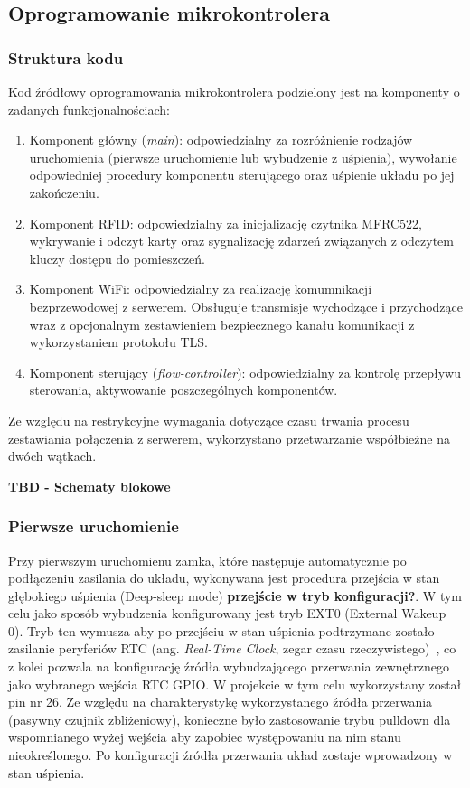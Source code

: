         \subsection{Oprogramowanie mikrokontrolera}

            \subsubsection{Struktura kodu}
                Kod źródłowy oprogramowania mikrokontrolera podzielony jest na komponenty o zadanych funkcjonalnościach:
                \begin{enumerate}
                    \item Komponent główny (\textit{main}): odpowiedzialny za rozróżnienie rodzajów uruchomienia (pierwsze uruchomienie lub wybudzenie z uśpienia), wywołanie odpowiedniej procedury komponentu sterującego oraz uśpienie układu po jej zakończeniu.
                    \item Komponent RFID: odpowiedzialny za inicjalizację czytnika MFRC522, wykrywanie i odczyt karty oraz sygnalizację zdarzeń związanych z odczytem kluczy dostępu do pomieszczeń.
                    \item Komponent WiFi: odpowiedzialny za realizację komumnikacji bezprzewodowej z serwerem. Obsługuje transmisje wychodzące i przychodzące wraz z opcjonalnym zestawieniem bezpiecznego kanału komunikacji z wykorzystaniem protokołu TLS.
                    \item Komponent sterujący (\textit{flow-controller}): odpowiedzialny za kontrolę przepływu sterowania, aktywowanie poszczególnych komponentów.
                \end{enumerate}

                Ze względu na restrykcyjne wymagania dotyczące czasu trwania procesu zestawiania połączenia z serwerem, wykorzystano przetwarzanie współbieżne na dwóch wątkach.

            \textbf{TBD - Schematy blokowe}

            \subsubsection{Pierwsze uruchomienie}

                Przy pierwszym uruchomienu zamka, które następuje automatycznie po podłączeniu zasilania do układu, wykonywana jest procedura przejścia w stan głębokiego uśpienia (Deep-sleep mode) \textbf{przejście w tryb konfiguracji?}. W tym celu jako sposób wybudzenia konfigurowany jest tryb EXT0 (External Wakeup 0). Tryb ten wymusza aby po przejściu w stan uśpienia podtrzymane zostało zasilanie peryferiów RTC (ang. \textit{Real-Time Clock}, zegar czasu rzeczywistego)~\cite{esp32-api-ref-deep-sleep}, co z kolei pozwala na konfigurację źródła wybudzającego przerwania zewnętrznego jako wybranego wejścia RTC GPIO. W projekcie w tym celu wykorzystany został pin nr 26. Ze względu na charakterystykę wykorzystanego źródła przerwania (pasywny czujnik zbliżeniowy), konieczne było zastosowanie trybu pulldown dla wspomnianego wyżej wejścia aby zapobiec występowaniu na nim stanu nieokreślonego. Po konfiguracji źródła przerwania układ zostaje wprowadzony w stan uśpienia.

